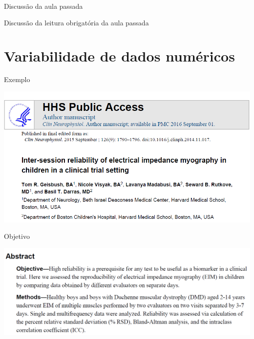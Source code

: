\documentclass{beamer}
\begin{document}

\begin{frame}{\scriptsize Discussão da aula passada}
  \begin{block}{}
    \footnotesize
    Discussão da leitura obrigatória da aula passada
  \end{block}
\end{frame}

\section{Variabilidade de dados numéricos}

\begin{frame}{\scriptsize Exemplo}
  \begin{center}
    \includegraphics[width=1.2\textwidth]{Cap3/DP1}
  \end{center}
\end{frame}


\begin{frame}{\scriptsize Objetivo}
  \begin{center}
    \includegraphics[width=1.2\textwidth]{Cap3/RSD0}
  \end{center}
\end{frame}
\end{document}

